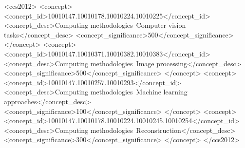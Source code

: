 \begin{CCSXML}
<ccs2012>
    <concept>
        <concept_id>10010147.10010178.10010224.10010225</concept_id>
        <concept_desc>Computing methodologies~Computer vision tasks</concept_desc>
        <concept_significance>500</concept_significance>
    </concept>
    <concept>
        <concept_id>10010147.10010371.10010382.10010383</concept_id>
        <concept_desc>Computing methodologies~Image processing</concept_desc>
        <concept_significance>500</concept_significance>
    </concept>
    <concept>
        <concept_id>10010147.10010257.10010293</concept_id>
        <concept_desc>Computing methodologies~Machine learning approaches</concept_desc>
        <concept_significance>100</concept_significance>
    </concept>
    <concept>
        <concept_id>10010147.10010178.10010224.10010245.10010254</concept_id>
        <concept_desc>Computing methodologies~Reconstruction</concept_desc>
        <concept_significance>300</concept_significance>
    </concept>
</ccs2012>
\end{CCSXML}



